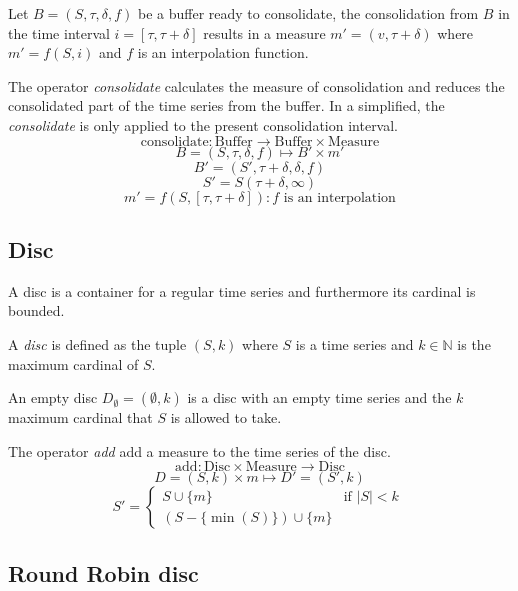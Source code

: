 Let $B=(S,\tau,\delta,f)$ be a buffer ready to consolidate, the
consolidation from $B$ in the time interval $i=[\tau,\tau+\delta]$
results in a measure $m'=(v,\tau+\delta)$ where $m'=f(S,i)$ and $f$ is
an interpolation function.

\begin{definition}
  The operator \emph{consolidate} calculates the measure of
  consolidation and reduces the consolidated part of the time series
  from the buffer. In a simplified, the \emph{consolidate} is only
  applied to the present consolidation interval.
  \[
  \text{consolidate}: \text{Buffer} \longrightarrow \text{Buffer}
  \times \text{Measure}
  \]
  \[
  B=(S,\tau,\delta,f) \mapsto B' \times m'
  \]
  \[
  B'= (S',\tau+\delta,\delta,f)
  \]
  \[
  S' = S(\tau+\delta,\infty)
  \]
  \[
  m' = f(S,[\tau,\tau+\delta]): f \text{ is an interpolation}
  \]
\end{definition}



\subsection{Disc}\label{sec:model:disc}

A disc is a container for a regular time series and furthermore its
cardinal is bounded. 

\begin{definition}[Disc]
  A \emph{disc} is defined as the tuple $(S,k)$ where $S$ is a time
  series and $k\in\mathbb{N}$ is the maximum cardinal of $S$.
\end{definition}

An empty disc $D_{\emptyset} = (\emptyset,k)$ is a disc with an empty
time series and the $k$ maximum cardinal that $S$ is allowed to take.

\begin{definition}
  The operator \emph{add} add a measure to the time series of the disc.
  \[
  \text{add}: \text{Disc} \times \text{Measure} \longrightarrow \text{Disc}
  \]
  \[
  D=(S,k) \times m \mapsto D'= (S',k)
  \]
  \[
  S' =  
  \begin{cases}
      S\cup\{m\} &\text{if }  |S|<k\\
      (S-\{\min(S)\}) \cup \{m\} 
    \end{cases}  \
  \]
\end{definition}


\subsection{Round Robin disc}\label{sec:model:discroundrobin}


